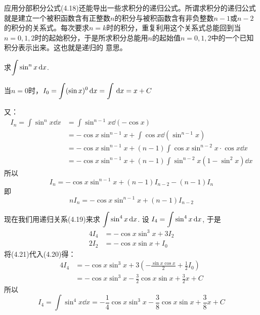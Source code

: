 应用分部积分公式(4.18)还能导出一些求积分的递归公式。所谓求积分的递归公式就是建立一个被积函数含有正整数$n$的积分与被积函数含有非负整数$n-1$或$n-2$的积分的关系式。每次要求$n=k$时的积分，重复利用这个关系式总能回到当$n=0, 1, 2$时的起始积分，于是所求积分总能用$n$的起始值$n=0, 1, 2$中的一个已知积分表示出来。这也就是递归的
意思。
    
\begin{example}
    求$\displaystyle\int \sin^n x\,{\rm d} x$.
\end{example}

\begin{solution}
当$n=0$时，$I_0=\displaystyle\int (\sin x)^0\,{\rm d} x=\displaystyle\int \,{\rm d} x=x+C$

又：
\[
\begin{split}
I_{n} =\int \sin ^{n} x \dd x&=\int \sin ^{n-1} x \dd(-\cos x) \\
&=-\cos x \sin ^{n-1} x+\int \cos x \dd\left(\sin ^{n-1} x\right) \\
&=-\cos x \sin ^{n-1} x+(n-1) \int \cos x \sin ^{n-2} x \cdot \cos x \dd x \\
&=-\cos x \sin ^{n-1} x+(n-1) \int \sin ^{n-2} x\left(1-\sin ^{2} x\right) \dd x
\end{split}
\]
所以
$$
I_{n}=-\cos x \sin ^{n-1} x+(n-1) I_{n-2}-(n-1) I_{n}
$$
即
\begin{equation}
   n I_{n}=-\cos x \sin ^{n-1} x+(n-1) I_{n-2} 
\end{equation}

现在我们用递归关系(4.19)来求 $\displaystyle\int \sin ^{4} x \,{\rm d} x$. 
设 $I_{4}=\displaystyle\int \sin ^{4} x \,{\rm d} x$, 于是
\begin{align}
4 I_{4}&=-\cos x \sin ^{3} x+3 I_{2} \\
2 I_{2}&=-\cos x \sin x+I_{0} 
\end{align}
将(4.21)代入(4.20)得：
\[\begin{split}
    4I_4&=-\cos x\sin^3 x+3\left(-\frac{\sin x\cos x}{2}+\frac{1}{2}I_0\right)\\
    &=-\cos x\sin^3 x-\frac{3}{2}\cos x\sin x+\frac{3}{2}x+C
\end{split}\]
所以
\[I_4=\int \sin^4 x\dd x=-\frac{1}{4}\cos x\sin^3 x-\frac{3}{8}\cos x\sin x+\frac{3}{8}x+C\]



\end{solution}
